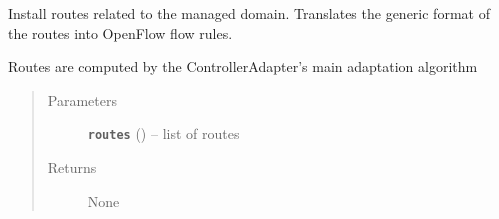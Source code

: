 \documentclass[letterpaper,10pt,english]{sphinxmanual}
\begin{document}
\begin{fulllineitems}
\begin{fulllineitems}
\end{fulllineitems}


\begin{fulllineitems}
\label{adapt/domain_adapters:escape.adapt.domain_adapters.POXDomainAdapter.install_routes}
Install routes related to the managed domain. Translates the generic
format of the routes into OpenFlow flow rules.

Routes are computed by the ControllerAdapter's main adaptation algorithm
\begin{quote}\begin{description}
\item[{Parameters}] \leavevmode
\textbf{\texttt{routes}} ({\hyperref[util/nffg:escape.util.nffg.NFFG]{\emph{}}}) -- list of routes

\item[{Returns}] \leavevmode
None

\end{description}\end{quote}

\end{fulllineitems}


\end{fulllineitems}

\end{document}

